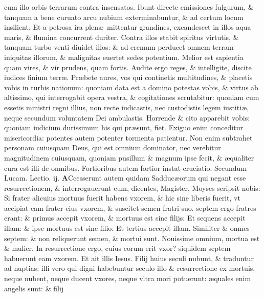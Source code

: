 \documentclass[a5paper,10pt]{book}
\def\leftmarginnote{%
	\lrmarginnote{\hskip -\marginparsep \hskip -6.5em}}
\def\rightmarginnote{%
	\lrmarginnote{\hskip\columnwidth \hskip -1em}}
\def\ae{æ}
\begin{document}
\begin{multicols*}{2}
cum illo orbis terrarum contra insensatos.
Ibunt directe emissiones fulgurum, \& tanquam a bene curuato arcu nubium exterminabuntur, \& ad certum locum insilient.
Et a petrosa ira plen\ae \ mittentur grandines, excandescet in illos aqua maris, \& flumina concurrent duriter.
Contra illos stabit spiritus virtutis, \& tanquam turbo venti diuidet illos: \& ad eremum perducet omnem terram iniquitas illorum, \& malignitas euertet sedes potentium.
\newline \indent Melior\leftmarginnote{\begin{flushright}ca. 6.\end{flushright}} est sapientia quam vires, \& vir prudens, quam fortis.
Audite ergo reges, \& intelligite, discite iudices finium terr\ae . Pr\ae bete aures, vos qui continetis multitudines, \& placetis vobis in turbis nationum: quoniam data est a domino potestas vobis, \& virtus ab altissimo, qui interrogabit opera vestra, \& cogitationes scrutabitur: quoniam cum essetis ministri regni illius, non recte iudicastis, nec custodistis legem iustiti\ae , neque secundum voluntatem Dei ambulastis.
Horrende \& cito apparebit vobis: quoniam iudicium durissimum his qui pr\ae sunt, fiet. Exiguo enim conceditur misericordia: potentes autem potenter tormenta patientur.
Non enim subtrahet personam cuiusquam Deus, qui est omnium dominator, nec verebitur magnitudinem cuiusquam, quoniam pusillum \& magnum ipse fecit, \& \ae qualiter cura est illi de omnibus.
Fortioribus autem fortior instat cruciatio.
\newline \color{red} Secundum Lucam. \hfill Lectio. ij. \color{black}
\vspace{-.25em}
\lettrine[lines=2]{\bfseries \color{red} A}{}Ccesserunt\rightmarginnote{c. 20.} autem quidam Sadduc\ae orum qui negant esse resurrectionem, \& interrogauerunt eum, dicentes, Magister, Moyses scripsit nobis: Si frater alicuius mortuus fuerit habens vxorem, \& hic sine liberis fuerit, vt accipiat eam frater eius vxorem, \& suscitet semen fratri suo. septem ergo fratres erant: \& primus accepit vxorem, \& mortuus est sine filijs: Et sequens accepit illam: \& ipse mortuus est sine filio.
Et tertius accepit illam. Similiter \& omnes septem: \& non reliquerunt semen, \& mortui sunt. Nouissime omnium, mortua est \& mulier.
In resurrectione ergo, cuius eorum erit vxor? siquidem septem habuerunt eam vxorem. Et ait illis Iesus. Filij huius seculi nubunt, \& traduntur ad nuptias: illi vero qui digni habebuntur seculo illo \& resurrectione ex mortuis, neque nubent, neque ducent vxores, neque vltra mori potuerunt: \ae quales enim angelis sunt: \& filij

\end{multicols*}
\end{document}

